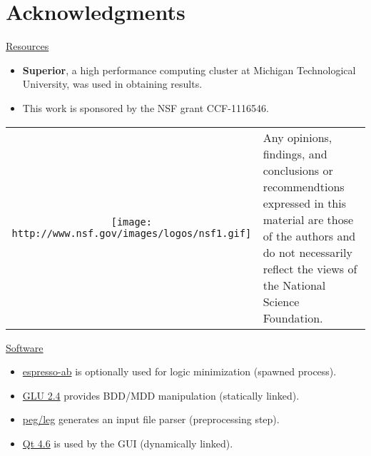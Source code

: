 
\section{Acknowledgments}

\underline{Resources}
\begin{itemize}
\item \textbf{Superior}, a high performance computing cluster at Michigan Technological University, was used in obtaining results.
\item This work is sponsored by the NSF grant CCF-1116546.
\end{itemize}
\begin{tabular}{cl}
\texttt{[image: http://www.nsf.gov/images/logos/nsf1.gif]}
& Any opinions, findings, and conclusions or recommendtions expressed in this material are those of the authors and do not necessarily reflect the views of the National Science Foundation.
\end{tabular}

\underline{Software}
\begin{itemize}
\item \href{http://code.google.com/p/eqntott/downloads/detail?name=espresso-ab-1.0.tar.gz}{espresso-ab} is optionally used for logic minimization (spawned process).
\item \href{http://vlsi.colorado.edu/~vis/Readme/README.glu}{GLU 2.4} provides BDD/MDD manipulation (statically linked).
\item \href{http://piumarta.com/software/peg/}{peg/leg} generates an input file parser (preprocessing step).
\item \href{http://qt-project.org/}{Qt 4.6} is used by the GUI (dynamically linked).
\end{itemize}

